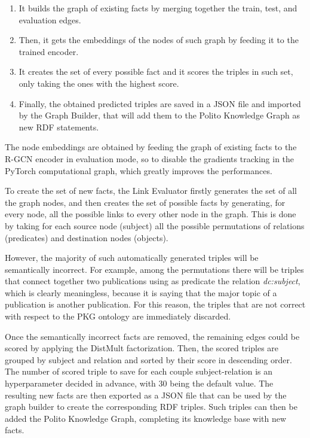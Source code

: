 \documentclass[%
    corpo=13.5pt,
    twoside,
    oldstyle,
    tipotesi=magistrale,
    greek,
    evenboxes
]{toptesi}
\begin{document}
\begin{enumerate}
    \item It builds the graph of existing facts by merging together the train,
        test, and evaluation edges.
    \item Then, it gets the embeddings of the nodes of such graph by feeding it
        to the trained encoder.
    \item It creates the set of every possible fact and it scores the triples in
        such set, only taking the ones with the highest score.
    \item Finally, the obtained predicted triples are saved in a JSON file
        and imported by the Graph Builder, that will add them to the Polito
        Knowledge Graph as new RDF statements.
\end{enumerate}

The node embeddings are obtained by feeding the graph of existing
facts to the R-GCN encoder in evaluation mode, so to disable the gradients
tracking in the PyTorch computational graph, which greatly improves the
performances.

To create the set of new facts, the Link Evaluator firstly
generates the set of all the graph nodes, and then creates the set of
possible facts by generating, for every node, all the possible links to
every other node in the graph. This is done by taking for each source node
(subject) all the possible permutations of relations (predicates) and
destination nodes (objects).

However, the majority of such automatically generated triples will be semantically
incorrect. For example, among the permutations there will be triples that
connect together two publications using as predicate the relation
\emph{dc:subject}, which is clearly meaningless, because it is saying that the
major topic of a publication is another publication.
For this reason, the triples that are not correct with respect to the PKG
ontology are immediately discarded.

Once the semantically incorrect facts are removed, the remaining edges could be
scored by applying the DistMult factorization.
Then, the scored triples are grouped by subject and relation and sorted by their
score in descending order.
The number of scored triple to save for each couple subject-relation is an
hyperparameter decided in advance, with 30 being the default value.
The resulting new facts are then exported as a JSON file that can be used by
the graph builder to create the corresponding RDF triples.
Such triples can then be added the Polito Knowledge Graph, completing its
knowledge base with new facts.
\end{document}
